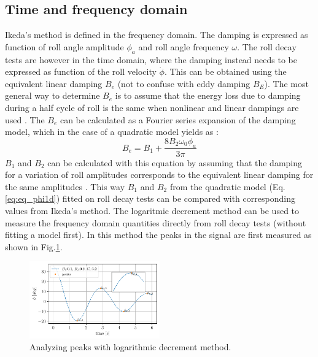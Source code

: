 \subsection*{Time and frequency domain}\label{time-and-frequency-domain}
\label{se:time_and_frequency} Ikeda's method is defined in the
frequency domain. The damping is expressed as function of roll angle
amplitude $\phi_a$ and roll angle frequency $\omega$. The roll decay
tests are however in the time domain, where the damping instead needs to
be expressed as function of the roll velocity $\dot{\phi}$. This can
be obtained using the equivalent linear damping $B_e$ (not to confuse
with eddy damping $B_E$). The most general way to determine $B_e$ is
to assume that the energy loss due to damping during a half cycle of
roll is the same when nonlinear and linear dampings are used
\citep{7505983/RYUBZITQ}. The $B_e$ can be calculated as a Fourier
series expansion of the damping model, which in the case of a quadratic
model yields as \citep{7505983/FB64RGPF}:
\begin{equation}
B_{e} = B_{1} + \frac{8 B_{2} \omega_{0} \phi_{a}}{3 \pi}
\label{eq:B_e_equation}
\end{equation}
$B_1$ and $B_2$ can be calculated with this equation by assuming
that the damping for a variation of roll amplitudes corresponds to the
equivalent linear damping for the same amplitudes
\citep{7505983/FB64RGPF}. This way $B_1$ and $B_2$ from the quadratic
model (Eq.\ref{eq:eq_phi1d}) fitted on roll decay tests can be
compared with corresponding values from Ikeda's method. The logaritmic
decrement method \citep{7505983/BYNJ8CFG} can be used to measure the
frequency domain quantities directly from roll decay tests (without
fitting a model first). In this method the peaks in the signal are first
measured as shown in Fig.\ref{fig:peaks}.
\begin{figure}[H]
\begin{center}\includegraphics[width = 0.5\textwidth]{figures/peaks.pdf}\end{center}
\vspace{-1cm}
\caption{Analyzing peaks with logarithmic decrement method.}
\label{fig:peaks}
\end{figure}
